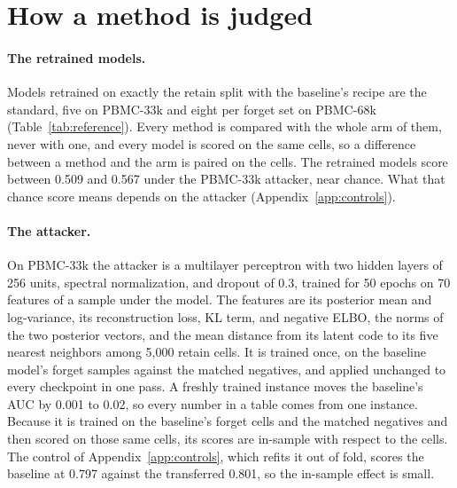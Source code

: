 \documentclass{article}
\begin{document}
\section{How a method is judged}
\label{sec:measurement}

\paragraph{The retrained models.} Models retrained on exactly the retain split with the baseline's recipe are the standard, five on PBMC-33k and eight per forget set on PBMC-68k (Table~\ref{tab:reference}). Every method is compared with the whole arm of them, never with one, and every model is scored on the same cells, so a difference between a method and the arm is paired on the cells. The retrained models score between 0.509 and 0.567 under the PBMC-33k attacker, near chance. What that chance score means depends on the attacker (Appendix~\ref{app:controls}).

\begin{table}[t]
\centering
\caption{The retrained models and the controls on PBMC cluster 13. The audit column is the likelihood-ratio audit against a retrained reference; for the clean retrains it is the range over every ordered pair of the five clean retrains, each scored against another (0.17 to 0.83). Generated from \texttt{nested\_ci\_all.json}, \texttt{retrain\_refit.json}, and \texttt{attack\_lr\_reference.json}.}
\label{tab:reference}
\small
\resizebox{\textwidth}{!}{}
\end{table}

\paragraph{The attacker.} On PBMC-33k the attacker is a multilayer perceptron with two hidden layers of 256 units, spectral normalization, and dropout of 0.3, trained for 50 epochs on 70 features of a sample under the model. The features are its posterior mean and log-variance, its reconstruction loss, KL term, and negative ELBO, the norms of the two posterior vectors, and the mean distance from its latent code to its five nearest neighbors among 5,000 retain cells. It is trained once, on the baseline model's forget samples against the matched negatives, and applied unchanged to every checkpoint in one pass. A freshly trained instance moves the baseline's AUC by 0.001 to 0.02, so every number in a table comes from one instance. Because it is trained on the baseline's forget cells and the matched negatives and then scored on those same cells, its scores are in-sample with respect to the cells. The control of Appendix~\ref{app:controls}, which refits it out of fold, scores the baseline at 0.797 against the transferred 0.801, so the in-sample effect is small.
\end{document}
